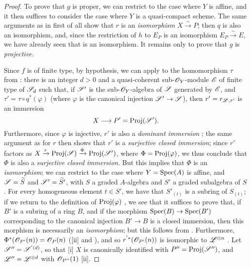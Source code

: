 \begin{proof}
To prove that $g$ is proper, we can restrict to the case where $Y$ is affine, and it then suffices to consider the case where $Y$ is a quasi-compact scheme.
The same arguments as in  first of all show that $r$ is an \emph{isomorphism} $X\xrightarrow{\sim}P$;
then $q$ is also an isomorphism, and, since the restriction of $h$ to $E_P$ is an isomorphism $E_P\xrightarrow{\sim}E$, we have already seen that  is an isomorphism.
It remains only to prove that $g$ is \emph{projective}.

Since $f$ is of finite type, by hypothesis, we can apply  to the homomorphism
$\tau$ from :
there is an integer $d>0$ and a quasi-coherent sub-$\mathscr{O}_Y$-module $\mathscr{E}$ of finite type of $\mathscr{S}_d$ such that, if $\mathscr{S}'$ is the sub-$\mathscr{O}_Y$-algebra of $\mathscr{S}$ generated by $\mathscr{E}$, and $\tau'=\tau\circ q^*(\varphi)$ (where $\varphi$ is the canonical injection $\sh{S}'\to\sh{S}$), then $r'=r_{\mathscr{L},\tau'}$ is an immersion
\[
  X\to P'=\Proj(\sh{S}').
\]
Furthermore, since $\varphi$ is injective, $r'$ is also a \emph{dominant immersion} ;
the same argument as for $r$ then shows that $r'$ is a \emph{surjective closed immersion};
since $r'$ factors as $X\xrightarrow{r}\operatorname{Proj}(\mathscr{S})\xrightarrow{\Phi}\operatorname{Proj}(\mathscr{S}')$, where $\Phi=\operatorname{Proj}(\varphi)$, we thus conclude that $\Phi$ is also a \emph{surjective closed immersion}.
But this implies that $\Phi$ is an \emph{isomorphism};
we can restrict to the case where $Y=\operatorname{Spec}(A)$ is affine, and $\mathscr{S}=\widetilde{S}$ and $\mathscr{S}'=\widetilde{S'}$, with $S$ a graded $A$-algebra and $S'$ a graded subalgebra of $S$.
For every homogeneous element $t\in S'$, we have that $S'_{(t)}$ is a subring of $S_{(t)}$;
if we return to the definition of $\operatorname{Proj}(\varphi)$ , we see that it suffices to prove that, if $B'$ is a subring of a ring $B$, and if the morphism $\Spec(B)\to\Spec(B')$ corresponding to the canonical injection $B'\to B$ is a closed immersion, then this morphism is necessarily an \emph{isomorphism};
but this follows from .
Furthermore, $\Phi^*(\mathscr{O}_{P'}(n))=\mathscr{O}_P(n)$ ([ii] and ), and so $r^{'*}(\mathscr{O}_{P'}(n))$ is isomorphic to $\mathscr{L}^{\otimes n}$ .
Let $\mathscr{S}''=\mathscr{S}^{'(d)}$, so that [i] $X$ is canonically identified with $P''=\operatorname{Proj}(\mathscr{S}'')$, and $\mathscr{L}''=\mathscr{L}^{\otimes d}$ with $\mathscr{O}_{P''}(1)$ [ii].


\end{proof}

